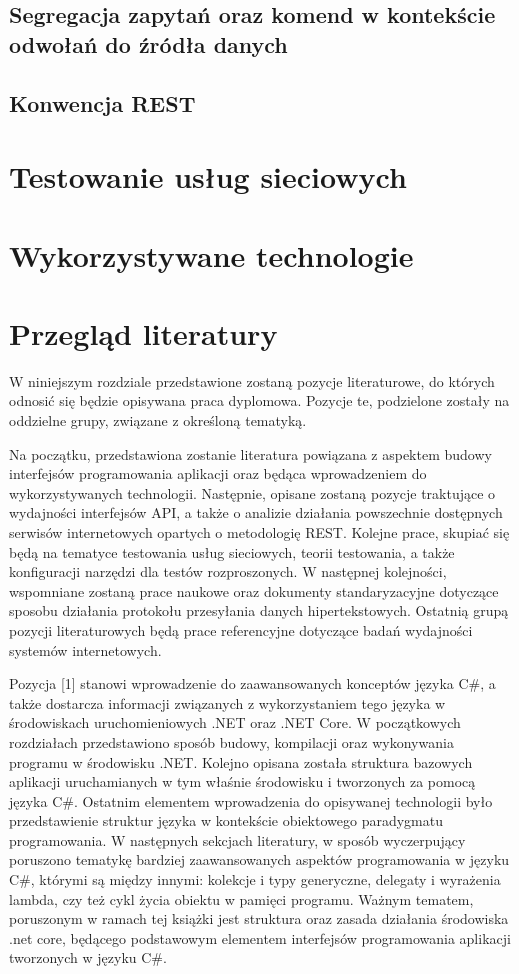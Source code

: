 \subsection*{Segregacja zapytań oraz komend w kontekście odwołań do źródła danych}
\subsection*{Konwencja REST}


\section{Testowanie usług sieciowych}
\section{Wykorzystywane technologie}
\section{Przegląd literatury}
W niniejszym rozdziale przedstawione zostaną pozycje literaturowe, do których odnosić się będzie opisywana praca dyplomowa. Pozycje te, podzielone zostały na oddzielne grupy, związane z określoną tematyką.

Na początku, przedstawiona zostanie literatura powiązana z aspektem budowy interfejsów programowania aplikacji oraz będąca wprowadzeniem do wykorzystywanych technologii. Następnie, opisane zostaną pozycje traktujące o wydajności interfejsów API, a także o analizie działania powszechnie dostępnych serwisów internetowych opartych o metodologię REST. Kolejne prace, skupiać się będą na tematyce testowania usług sieciowych, teorii testowania, a także konfiguracji narzędzi dla testów rozproszonych. W następnej kolejności, wspomniane zostaną prace naukowe oraz dokumenty standaryzacyjne dotyczące sposobu działania protokołu przesyłania danych hipertekstowych. Ostatnią grupą pozycji literaturowych będą prace referencyjne dotyczące badań wydajności systemów internetowych.

Pozycja [1] stanowi wprowadzenie do zaawansowanych konceptów języka C\#, a także dostarcza informacji związanych z wykorzystaniem tego języka w środowiskach uruchomieniowych .NET oraz .NET Core. W początkowych rozdziałach przedstawiono sposób budowy, kompilacji oraz wykonywania programu w środowisku .NET. Kolejno opisana została struktura bazowych aplikacji uruchamianych w tym właśnie środowisku i tworzonych za pomocą języka C\#. Ostatnim elementem wprowadzenia do opisywanej technologii było przedstawienie struktur języka w kontekście obiektowego paradygmatu programowania.    W następnych sekcjach literatury, w sposób wyczerpujący poruszono tematykę bardziej zaawansowanych aspektów programowania w języku C\#, którymi są między innymi: kolekcje i typy generyczne, delegaty i wyrażenia lambda, czy też cykl życia obiektu w pamięci programu. Ważnym tematem, poruszonym w ramach tej książki jest struktura oraz zasada działania środowiska .net core, będącego podstawowym elementem interfejsów programowania aplikacji tworzonych w języku C\#.

